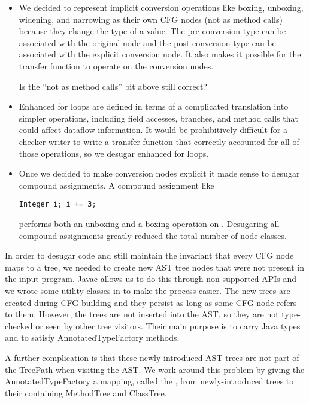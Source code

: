     \begin{itemize}
    \item We decided to represent implicit conversion operations like boxing, unboxing, widening,
    and narrowing as their own CFG nodes (not as method calls) because they change the type of a value.  The pre-conversion
    type can be associated with the original node and the post-conversion type can be associated
    with the explicit conversion node.  It also makes it possible for the transfer function to operate
    on the conversion nodes.
    
\begin{workinprogress}
Is the ``not as method calls'' bit above still correct?
\end{workinprogress}


    \item Enhanced for loops are defined in terms of a complicated translation into simpler
    operations, including field accesses, branches, and method calls that could affect dataflow
    information.  It would be prohibitively difficult for a checker writer to write a transfer function that
    correctly accounted for all of those operations, so we desugar enhanced for loops.
    
    \item Once we decided to make conversion nodes explicit it made sense to desugar
    compound assignments.  A compound assignment like \begin{verbatim}Integer i; i += 3;\end{verbatim} performs
    both an unboxing and a boxing operation on .  Desugaring all compound assignments
    greatly reduced the total number of node classes.

    \end{itemize}

In order to desugar code and still maintain the invariant that every CFG node maps to a tree, 
we needed to create new AST tree nodes that were not present in the input program.  Javac
allows us to do this through non-supported APIs and we wrote some utility classes in
 to make the process easier.  The new trees are created during CFG building
and they persist as long as some CFG node refers to them.  However, the trees are not
inserted into the AST, so they are not type-checked or seen by other tree visitors.  Their
main purpose is to carry Java types and to satisfy AnnotatedTypeFactory methods.

A further complication is that these newly-introduced AST trees are not part of the TreePath
when visiting the AST.  We work around this problem by giving the AnnotatedTypeFactory a
mapping, called the , from newly-introduced trees to their containing
MethodTree and ClassTree.

